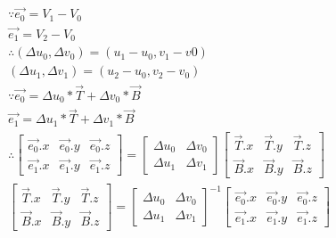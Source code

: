 \begin{gather*}
    \because \overrightarrow{e_{0}} = V_{1} - V_{0} \\ 
    \overrightarrow{e_{1}} = V_{2} - V_{0} \\ 
    \therefore (\Delta u_{0},\Delta v_{0}) = (u_{1} - u_{0}, v_{1} - v{0}) \\ 
    (\Delta u_{1}, \Delta v_{1}) = (u_{2} - u_{0}, v_{2} - v_{0}) \\ 
    \because \overrightarrow{e_{0}} = \Delta u_{0} \ast \overrightarrow{T} + \Delta v_{0} \ast \overrightarrow{B} \\
    \overrightarrow{e_{1}} = \Delta u_{1} \ast \overrightarrow{T} + \Delta v_{1} \ast \overrightarrow{B} \\
    \therefore \begin{bmatrix}
        \overrightarrow{e_{0}}.x & \overrightarrow{e_{0}}.y & \overrightarrow{e_{0}}.z \\ 
        \overrightarrow{e_{1}}.x & \overrightarrow{e_{1}}.y & \overrightarrow{e_{1}}.z  
    \end{bmatrix} = \begin{bmatrix}
        \Delta u_{0} & \Delta v_{0} \\ 
        \Delta u_{1} & \Delta v_{1}
    \end{bmatrix} \begin{bmatrix}
        \overrightarrow{T}.x & \overrightarrow{T}.y & \overrightarrow{T}.z \\ 
        \overrightarrow{B}.x & \overrightarrow{B}.y & \overrightarrow{B}.z  
    \end{bmatrix} \\ 
    \begin{bmatrix}
        \overrightarrow{T}.x & \overrightarrow{T}.y & \overrightarrow{T}.z \\ 
        \overrightarrow{B}.x & \overrightarrow{B}.y & \overrightarrow{B}.z  
    \end{bmatrix} = \begin{bmatrix}
        \Delta u_{0} & \Delta v_{0} \\ 
        \Delta u_{1} & \Delta v_{1}
    \end{bmatrix}^{-1} \begin{bmatrix}
        \overrightarrow{e_{0}}.x & \overrightarrow{e_{0}}.y & \overrightarrow{e_{0}}.z \\ 
        \overrightarrow{e_{1}}.x & \overrightarrow{e_{1}}.y & \overrightarrow{e_{1}}.z  
    \end{bmatrix} \\ 

\end{gather*}
